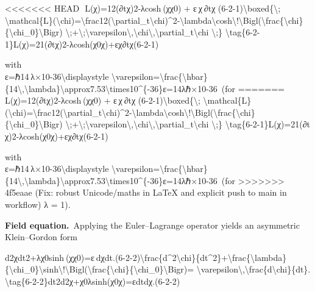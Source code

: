 \documentclass[]{article}
\begin{document}
<<<<<<< HEAD
  L(χ)=12(∂tχ)2-λcosh⁡ ⁣(χχ0)  +  ε χ ∂tχ  (6-2-1)\textbackslash boxed\{\textbackslash;
\textbackslash mathcal\{L\}(\textbackslash chi)=\textbackslash frac12(\textbackslash partial\_t\textbackslash chi)\^{}2-\textbackslash lambda\textbackslash cosh\textbackslash!\textbackslash Bigl(\textbackslash frac\{\textbackslash chi\}\{\textbackslash chi\_0\}\textbackslash Bigr)
\textbackslash;+\textbackslash;\textbackslash varepsilon\textbackslash,\textbackslash chi\textbackslash,\textbackslash partial\_t\textbackslash chi
\textbackslash;\}
\textbackslash tag\{6-2-1\}L(χ)=21\hspace{0pt}(∂t\hspace{0pt}χ)2-λcosh(χ0\hspace{0pt}χ\hspace{0pt})+εχ∂t\hspace{0pt}χ\hspace{0pt}(6-2-1)

with\\
ε=ℏ14 λ×10-36\textbackslash displaystyle
\textbackslash varepsilon=\textbackslash frac\{\textbackslash hbar\}\{14\textbackslash,\textbackslash lambda\}\textbackslash approx7.53\textbackslash times10\^{}\{-36\}ε=14λℏ\hspace{0pt}×10-36 (for
=======
  L(χ)=12(∂tχ)2-λcosh⁡ ⁣(χχ0)  +  ε χ ∂tχ  (6-2-1)\textbackslash{}boxed\{\textbackslash{};
\textbackslash{}mathcal\{L\}(\textbackslash{}chi)=\textbackslash{}frac12(\textbackslash{}partial\_t\textbackslash{}chi)\^{}2-\textbackslash{}lambda\textbackslash{}cosh\textbackslash{}!\textbackslash{}Bigl(\textbackslash{}frac\{\textbackslash{}chi\}\{\textbackslash{}chi\_0\}\textbackslash{}Bigr)
\textbackslash{};+\textbackslash{};\textbackslash{}varepsilon\textbackslash{},\textbackslash{}chi\textbackslash{},\textbackslash{}partial\_t\textbackslash{}chi
\textbackslash{};\}
\textbackslash{}tag\{6-2-1\}L(χ)=21​(∂t​χ)2-λcosh(χ0​χ​)+εχ∂t​χ​(6-2-1)

with\\
ε=ℏ14 λ×10-36\textbackslash{}displaystyle
\textbackslash{}varepsilon=\textbackslash{}frac\{\textbackslash{}hbar\}\{14\textbackslash{},\textbackslash{}lambda\}\textbackslash{}approx7.53\textbackslash{}times10\^{}\{-36\}ε=14λℏ​×10-36 (for
>>>>>>> 4f5eaae (Fix: robust Unicode/maths in LaTeX and explicit push to main in workflow)
λ = 1).

\textbf{Field equation.} Applying the Euler--Lagrange operator yields an
asymmetric Klein--Gordon form

d2χdt2+λχ0sinh⁡ ⁣(χχ0)=ε dχdt.(6-2-2)\textbackslash{}frac\{d\^{}2\textbackslash{}chi\}\{dt\^{}2\}+\textbackslash{}frac\{\textbackslash{}lambda\}\{\textbackslash{}chi\_0\}\textbackslash{}sinh\textbackslash{}!\textbackslash{}Bigl(\textbackslash{}frac\{\textbackslash{}chi\}\{\textbackslash{}chi\_0\}\textbackslash{}Bigr)=
\textbackslash{}varepsilon\textbackslash{},\textbackslash{}frac\{d\textbackslash{}chi\}\{dt\}.
\textbackslash{}tag\{6-2-2\}dt2d2χ​+χ0​λ​sinh(χ0​χ​)=εdtdχ​.(6-2-2)
\end{document}
